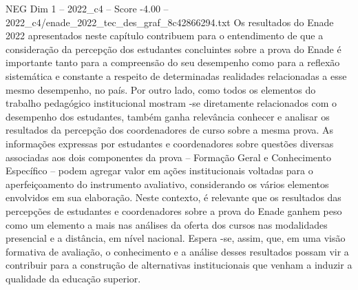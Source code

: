 \begin{textsample}{NEG Dim 1 – 2022\_c4 – Score -4.00 – 2022\_c4/enade\_2022\_tec\_des\_graf\_8c42866294.txt}
Os resultados do Enade 2022 apresentados neste capítulo contribuem para o entendimento de que a consideração da percepção dos estudantes concluintes sobre a prova do Enade é importante tanto para a compreensão do seu desempenho como para a reflexão sistemática e constante a respeito de determinadas realidades relacionadas a esse mesmo desempenho, no país.
Por outro lado, como todos os elementos do trabalho pedagógico institucional mostram -se diretamente relacionados com o desempenho dos estudantes, também ganha relevância conhecer e analisar os resultados da percepção dos coordenadores de curso sobre a mesma prova.
As informações expressas por estudantes e coordenadores sobre questões diversas associadas aos dois componentes da prova – Formação Geral e Conhecimento Específico – podem agregar valor em ações institucionais voltadas para o aperfeiçoamento do instrumento avaliativo, considerando os vários elementos envolvidos em sua elaboração.
Neste contexto, é relevante que os resultados das percepções de estudantes e coordenadores sobre a prova do Enade ganhem peso como um elemento a mais nas análises da oferta dos cursos nas modalidades presencial e a distância, em nível nacional.
Espera -se, assim, que, em uma visão formativa de avaliação, o conhecimento e a análise desses resultados possam vir a contribuir para a construção de alternativas institucionais que venham a induzir a qualidade da educação superior.

\end{textsample}
